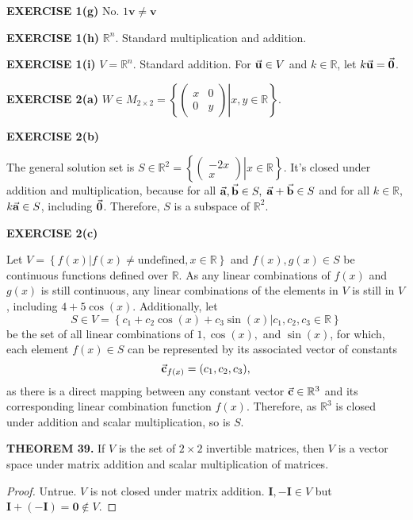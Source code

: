 \documentclass[12pt]{article}
\newcommand{\mat}[1]{\mathbf{#1}}
\newcommand{\exercise}[1]{\textbf{EXERCISE #1}\label{#1}}
\newcommand{\theorem}[2]{\textbf{THEOREM #1.} #2}
\begin{document}
\exercise{1(g)} No. $1\mat{v} \ne \mat{v}$

\exercise{1(h)} $\mathbb{R}^{n}$. Standard multiplication and addition.

\exercise{1(i)} $V = \mathbb{R}^{n}$. Standard addition. For $\va{u} \in V$ and $k \in \mathbb{R}$, let $k\va{u} = \va{0}$.

\exercise{2(a)} $W \in M_{2 \times 2} = \left\{ \left. \begin{pmatrix} x & 0 \\ 0 & y \end{pmatrix} \right| x,y \in \mathbb{R} \right\}$.

\exercise{2(b)}

The general solution set is $S \in \mathbb{R}^{2} = \left\{ \left. \begin{pmatrix} -2x \\ x \end{pmatrix} \right| x \in \mathbb{R} \right\}$. It's closed under addition and multiplication, because for all $\va{a}, \va{b} \in S,$ $\va{a} + \va{b} \in S$ and for all $k \in \mathbb{R}$, $k\va{a} \in S$, including $\va{0}$. Therefore, $S$ is a subspace of $\mathbb{R}^{2}$.

\exercise{2(c)}

Let $V = \left\{\left. f(x) \right| f(x) \ne \text{undefined}, x \in \mathbb{R} \right\}$ and $f(x), g(x) \in S$ be continuous functions defined over $\mathbb{R}$. As any linear combinations of $f(x)$ and $g(x)$ is still continuous, any linear combinations of the elements in $V$ is still in $V$, including $4+5\cos(x)$. Additionally, let 
$$S \in V = \left\{ \left. c_{1} + c_{2} \cos(x) + c_{3} \sin(x) \right| c_1, c_2, c_3 \in \mathbb{R} \right\}$$
be the set of all linear combinations of $1, \cos(x),$ and $\sin(x)$, for which, each element $f(x) \in S$ can be represented by its associated vector of constants 
$$\va{c}_{f(x)} = (c_1, c_2, c_3),$$
as there is a direct mapping between any constant vector $\va{c} \in \mathbb{R}^{3}$ and its corresponding linear combination function $f(x)$. Therefore, as $\mathbb{R}^{3}$ is closed under addition and scalar multiplication, so is $S$.

\theorem{39}{If $V$ is the set of $2 \times 2$ invertible matrices, then $V$ is a vector space under matrix addition and scalar multiplication of matrices.}

\begin{proof}
Untrue. $V$ is not closed under matrix addition. $\mat{I}, -\mat{I} \in V$ but $\mat{I} + (-\mat{I}) = \mat{0} \not\in V$.
\end{proof}
\end{document}
